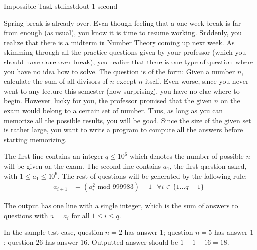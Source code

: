 \begin{problem}{Impossible Task}
{stdin}{stdout}
{1 second}{}{}

Spring break is already over. Even though feeling that a one week break is far from enough (as usual), 
you know it is time to resume working. Suddenly, you realize that there is a midterm in Number Theory
coming up next week. As skimming through all the practice questions given by your professor (which 
you should have done over break), you realize that there is one type of question where you have no idea
how to solve. The question is of the form: Given a number $n$, calculate the sum of all divisors of $n$ except
$n$ itself. Even worse, since you never went to any lecture this semester (how surprising), you have no
clue where to begin. However, lucky for you, the professor promised that the given $n$ on the exam would
belong to a certain set of number. Thus, as long as you can memorize all the possible results, you will be
good. Since the size of the given set is rather large, you want to write a program to compute all the answers before
starting memorizing.

\InputFile

The first line contains an integer $q \leq 10^6$ which denotes the number of possible $n$ will be given on the exam. The second line contains $a_1$, the first question asked, with $1 \le a_1 \le 10^6$. The rest of questions will be generated by the following rule: 
\begin{align*}
	a_{i+1} &= (a_i^2 \text{ mod } 999983) + 1 & \forall i \in \{1 \hdots q-1\}
\end{align*}

\OutputFile

The output has one line with a single integer, which is the sum of answers to questions with $n = a_i$ for all $1 \le i \le q$. 

\Examples

\begin{example}
%
\end{example}

\Notes

In the sample test case, question $n = 2$ has answer $1$; question $n = 5$ has answer $1$; question $26$ has answer $16$. Outputted answer should be $1 + 1 + 16 = 18$. 

\end{problem}

